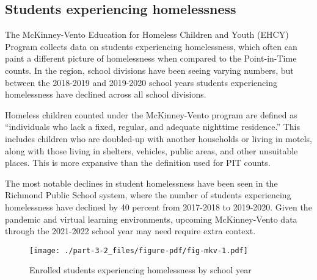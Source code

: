 \documentclass[
  letterpaper,
  DIV=11,
  numbers=noendperiod]{scrreprt}
\begin{document}
\hypertarget{students-experiencing-homelessness}{%
\subsection{Students experiencing
homelessness}\label{students-experiencing-homelessness}}

The McKinney-Vento Education for Homeless Children and Youth (EHCY)
Program collects data on students experiencing homelessness, which often
can paint a different picture of homelessness when compared to the
Point-in-Time counts. In the region, school divisions have been seeing
varying numbers, but between the 2018-2019 and 2019-2020 school years
students experiencing homelessness have declined across all school
divisions.

\begin{tcolorbox}[enhanced jigsaw, colframe=quarto-callout-tip-color-frame, arc=.35mm, bottomrule=.15mm, colbacktitle=quarto-callout-tip-color!10!white, opacityback=0, left=2mm, rightrule=.15mm, title=\textcolor{quarto-callout-tip-color}{\faLightbulb}\hspace{0.5em}{Defining student homelessness}, colback=white, coltitle=black, toptitle=1mm, leftrule=.75mm, titlerule=0mm, breakable, opacitybacktitle=0.6, toprule=.15mm, bottomtitle=1mm]

Homeless children counted under the McKinney-Vento program are defined
as ``individuals who lack a fixed, regular, and adequate nighttime
residence.'' This includes children who are doubled-up with another
households or living in motels, along with those living in shelters,
vehicles, public areas, and other unsuitable places. This is more
expansive than the definition used for PIT counts.

\end{tcolorbox}

The most notable declines in student homelessness have been seen in the
Richmond Public School system, where the number of students experiencing
homelessness have declined by 40 percent from 2017-2018 to 2019-2020.
Given the pandemic and virtual learning environments, upcoming
McKinney-Vento data through the 2021-2022 school year may need require
extra context.

\begin{figure}

{\centering \texttt{[image: ./part-3-2\_files/figure-pdf/fig-mkv-1.pdf]}

}

\caption{\label{fig-mkv}Enrolled students experiencing homelessness by
school year}

\end{figure}
\end{document}
